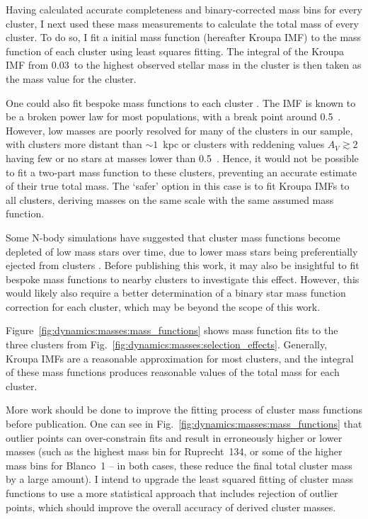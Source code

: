 Having calculated accurate completeness and binary-corrected mass bins for every cluster, I next used these mass measurements to calculate the total mass of every cluster. To do so, I fit a \cite{kroupa_variation_2001} initial mass function (hereafter Kroupa IMF) to the mass function of each cluster using least squares fitting. The integral of the Kroupa IMF from 0.03~\MSun to the highest observed stellar mass in the cluster is then taken as the mass value for the cluster.

One could also fit bespoke mass functions to each cluster \citep[e.g. as in][]{cordoni_photometric_binaries_2023}. The IMF is known to be a broken power law for most populations, with a break point around 0.5~\MSun \citep{kroupa_variation_2001}. However, low masses are poorly resolved for many of the clusters in our sample, with clusters more distant than $\sim1$~kpc or clusters with reddening values $A_V \gtrsim 2$ having few or no stars at masses lower than 0.5~\MSun. Hence, it would not be possible to fit a two-part mass function to these clusters, preventing an accurate estimate of their true total mass. The `safer' option in this case is to fit Kroupa IMFs to all clusters, deriving masses on the same scale with the same assumed mass function.

Some N-body simulations have suggested that cluster mass functions become depleted of low mass stars over time, due to lower mass stars being preferentially ejected from clusters \citep{krause_physics_2020}. Before publishing this work, it may also be insightful to fit bespoke mass functions to nearby clusters to investigate this effect. However, this would likely also require a better determination of a binary star mass function correction for each cluster, which may be beyond the scope of this work.

Figure~\ref{fig:dynamics:masses:mass_functions} shows mass function fits to the three clusters from Fig.~\ref{fig:dynamics:masses:selection_effects}. Generally, Kroupa IMFs are a reasonable approximation for most clusters, and the integral of these mass functions produces reasonable values of the total mass for each cluster. 

More work should be done to improve the fitting process of cluster mass functions before publication. One can see in Fig.~\ref{fig:dynamics:masses:mass_functions} that outlier points can over-constrain fits and result in erroneously higher or lower masses (such as the highest mass bin for Ruprecht~134, or some of the higher mass bins for Blanco~1 -- in both cases, these reduce the final total cluster mass by a large amount). I intend to upgrade the least squared fitting of cluster mass functions to use a more statistical approach that includes rejection of outlier points, which should improve the overall accuracy of derived cluster masses.


